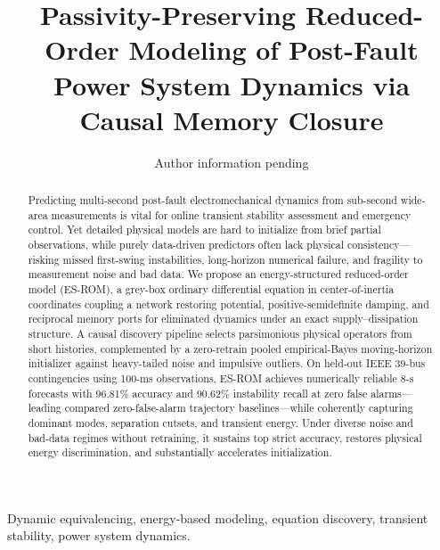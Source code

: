 \documentclass[journal]{IEEEtran}
\begin{document}
\title{Passivity-Preserving Reduced-Order Modeling of Post-Fault Power System Dynamics via Causal Memory Closure}
\author{Author information pending}
\maketitle

\begin{abstract}
Predicting multi-second post-fault electromechanical dynamics from sub-second
wide-area measurements is vital for online transient stability assessment and
emergency control.
Yet detailed physical models are hard to initialize from brief partial
observations, while purely data-driven predictors often lack physical
consistency---risking missed first-swing instabilities, long-horizon numerical
failure, and fragility to measurement noise and bad data.
We propose an energy-structured reduced-order model (ES-ROM), a grey-box
ordinary differential equation in center-of-inertia coordinates coupling a
network restoring potential, positive-semidefinite damping, and reciprocal
memory ports for eliminated dynamics under an exact supply--dissipation
structure.
A causal discovery pipeline selects parsimonious physical operators from short
histories, complemented by a zero-retrain pooled empirical-Bayes moving-horizon
initializer against heavy-tailed noise and impulsive outliers.
On held-out IEEE 39-bus contingencies using 100-ms observations, ES-ROM
achieves numerically reliable 8-s forecasts with 96.81\% accuracy and 90.62\%
instability recall at zero false alarms---leading compared zero-false-alarm
trajectory baselines---while coherently capturing dominant modes, separation
cutsets, and transient energy.
Under diverse noise and bad-data regimes without retraining, it sustains top
strict accuracy, restores physical energy discrimination, and substantially
accelerates initialization.
\end{abstract}

\begin{IEEEkeywords}
Dynamic equivalencing, energy-based modeling, equation discovery,
transient stability, power system dynamics.
\end{IEEEkeywords}


\end{document}
